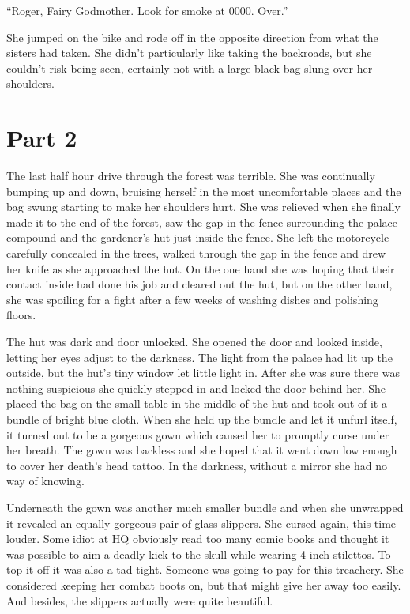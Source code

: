 \documentclass[11pt,letterpaper]{article}
\begin{document}
``Roger, Fairy Godmother. Look for smoke at 0000. Over.''

She jumped on the bike and rode off in the opposite direction from what the sisters had taken. She didn't particularly like taking the backroads, but she couldn't risk being seen, certainly not with a large black bag slung over her shoulders.

\section*{Part 2}

The last half hour drive through the forest was terrible. She was continually bumping up and down, bruising herself in the most uncomfortable places and the bag swung starting to make her shoulders hurt. She was relieved when she finally made it to the end of the forest, saw the gap in the fence surrounding the palace compound and the gardener's hut just inside the fence. She left the motorcycle carefully concealed in the trees, walked through the gap in the fence and drew her knife as she approached the hut. On the one hand she was hoping that their contact inside had done his job and cleared out the hut, but on the other hand, she was spoiling for a fight after a few weeks of washing dishes and polishing floors.

The hut was dark and door unlocked. She opened the door and looked inside, letting her eyes adjust to the darkness. The light from the palace had lit up the outside, but the hut's tiny window let little light in. After she was sure there was nothing suspicious she quickly stepped in and locked the door behind her. She placed the bag on the small table in the middle of the hut and took out of it a bundle of bright blue cloth. When she held up the bundle and let it unfurl itself, it turned out to be a gorgeous gown which caused her to promptly curse under her breath. The gown was backless and she hoped that it went down low enough to cover her death's head tattoo. In the darkness, without a mirror she had no way of knowing.

Underneath the gown was another much smaller bundle and when she unwrapped it revealed an equally gorgeous pair of glass slippers. She cursed again, this time louder. Some idiot at HQ obviously read too many comic books and thought it was possible to aim a deadly kick to the skull while wearing 4-inch stilettos. To top it off it was also a tad tight. Someone was going to pay for this treachery. She considered keeping her combat boots on, but that might give her away too easily. And besides, the slippers actually were quite beautiful.
\end{document}
